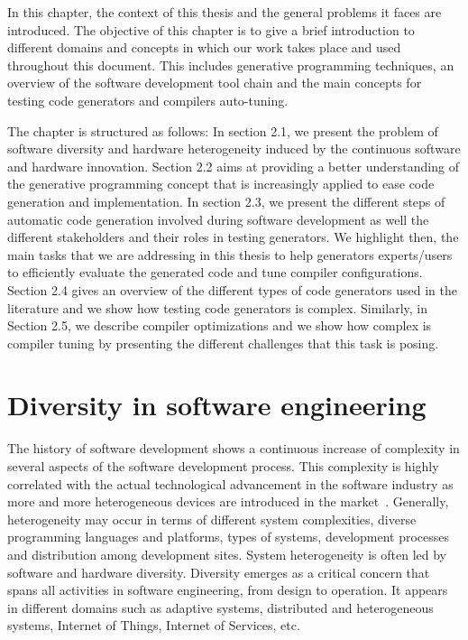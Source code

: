  
In this chapter, the context of this thesis and the general problems it faces are introduced. The objective of this chapter is to give a brief introduction to  different domains and concepts in which our work takes place and used throughout this document.
This includes generative programming techniques, an overview of the software development tool chain and the main concepts for testing code generators and compilers auto-tuning.


The chapter is structured as follows: In section 2.1, we present the problem of software diversity and hardware heterogeneity induced by the continuous software and hardware innovation. Section 2.2 aims at providing a better understanding of the 
generative programming concept that is increasingly applied to ease code generation and implementation. In section 2.3, we present the different steps of automatic code generation involved during software development as well the different stakeholders and their roles in testing generators. We highlight then, the main tasks that we are addressing in this thesis to help generators experts/users to efficiently evaluate the generated code and tune compiler configurations.
Section 2.4 gives an overview of the different types of code generators used in the literature and we show how testing code generators is complex. Similarly, in Section 2.5, we describe compiler optimizations and we show how complex is compiler tuning by presenting the different challenges that this task is posing.


\section{Diversity in software engineering}
The history of software development shows a continuous increase of complexity in several aspects of the software development process. This complexity is highly correlated with the actual technological advancement in the software industry as more and more heterogeneous devices are introduced in the market~\cite{betz2011improving}. 
Generally, heterogeneity may occur in terms of different system complexities, diverse programming languages and platforms, types of systems, development processes and distribution among development sites\cite{ghazi2015heterogeneous}.
System heterogeneity is often led by software and hardware diversity.
Diversity emerges as a critical concern that spans all activities in software engineering, from design to operation\cite{acher2014software}. It appears in different domains such as adaptive systems, distributed and heterogeneous systems, Internet of Things, Internet of Services, etc.

